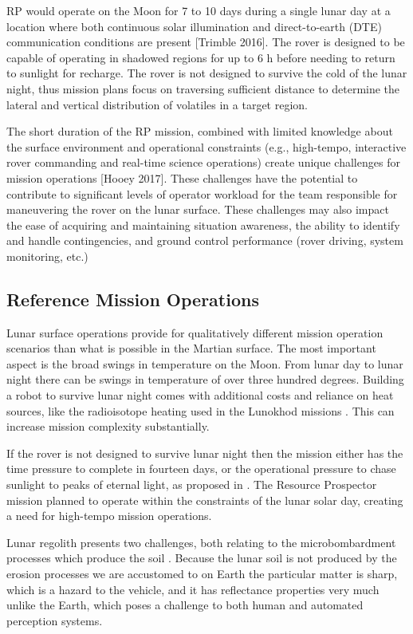 \documentclass[twocolumn,letterpaper]{IEEEAerospaceCLS}  %
\begin{document}
RP would operate on the Moon for 7 to 10 days during a single lunar day at a location where both continuous solar illumination and direct-to-earth (DTE) communication conditions are present [Trimble 2016]. The rover is designed to be capable of operating in shadowed regions for up to 6 h before needing to return to sunlight for recharge. The rover is not designed to survive the cold of the lunar night, thus mission plans focus on traversing sufficient distance to determine the lateral and vertical distribution of volatiles in a target region.

The short duration of the RP mission, combined with limited knowledge about the surface environment and operational constraints (e.g., high-tempo, interactive rover commanding and real-time science operations) create unique challenges for mission operations [Hooey 2017]. These challenges have the potential to contribute to significant levels of operator workload for the team responsible for maneuvering the rover on the lunar surface. These challenges may also impact the ease of acquiring and maintaining situation awareness, the ability to identify and handle contingencies, and ground control performance (rover driving, system monitoring, etc.)

\subsection{Reference Mission Operations}
Lunar surface operations provide for qualitatively different mission operation scenarios than what is possible in the Martian surface.  The most important aspect is the broad swings in temperature on the Moon.  From lunar day to lunar night there can be swings in temperature of over three hundred degrees.  Building a robot to survive lunar night comes with additional costs and reliance on heat sources, like the radioisotope heating used in the Lunokhod missions \cite{ulamec2010survive}.  This can increase mission complexity substantially.  

If the rover is not designed to survive lunar night then the mission either has the time pressure to complete in fourteen days, or the operational pressure to chase sunlight to peaks of eternal light, as proposed in \cite{otten2018strategic}.  The Resource Prospector mission planned to operate within the constraints of the lunar solar day, creating a need for high-tempo mission operations. 

Lunar regolith presents two challenges, both relating to the microbombardment processes which produce the soil \cite{XXX}.  Because the lunar soil is not produced by the erosion processes we are accustomed to on Earth the particular matter is sharp, which is a hazard to the vehicle, and it has reflectance properties very much unlike the Earth, which poses a challenge to both human and automated perception systems. 
\end{document}
